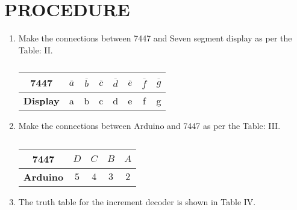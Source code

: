 \documentclass[conference]{IEEEtran}
\begin{document}
\section{PROCEDURE}
\begin {enumerate}
\item Make the connections between 7447 and Seven segment display as per the Table: II.
\begin{table}                       
\centering                          
\begin{tabular}{| c | c | c | c | c | c | c | c |} \hline                                
	\textbf{7447} & $\overline{a}$ & $\overline{b}$ & $ \overline{c}$ & $\overline{d}$ & $\overline{e}$ & $\overline{f}$  & $\overline{g}$ \\\hline 
\textbf{Display} & a & b & c & d & e & f & g \\ \hline                           
\end{tabular}             
\vspace{0.1cm}                                 
\caption{\label{tab:widgets}}                     
\end{table}
\item Make the connections between Arduino and 7447 as per the Table: III.

\begin{table} 
\centering
\begin{tabular}{| c | c | c | c | c |} \hline
\textbf{7447} & $D$ & $C$ & $B$ & $A$ \\\hline
\textbf{Arduino} & $5$ & $4$ & $3$ & $2$ \\ \hline 
\end{tabular}
\vspace{0.1cm}
\caption{\label{tab:widgets}}
\end{table}
\item The truth table for the increment decoder is shown in Table IV.


\end{enumerate}
\end{document}
